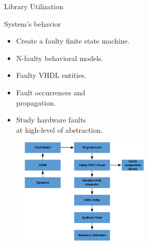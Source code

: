 \documentclass[aspectratio=1610]{beamer}
\begin{document}
\begin{frame}{Library Utilization}

\begin{block}{System's behavior}

\end{block}

\begin{itemize}

\item Create a faulty finite state machine.
\item N-faulty behavioral models.
\item Faulty VHDL entities.

\item Fault occurrences and \\ propagation.
\item Study hardware faults  \\ at high-level of abstraction.

\vspace{-3.2cm}
\end{itemize}
\begin{figure}[tb!]
 \centering
  \captionsetup{justification=centering}    
   \includegraphics[width=0.55\textwidth, right]{Figures/library.pdf}
\label{fig:library1}
\end{figure}


\end{frame}
\end{document}
